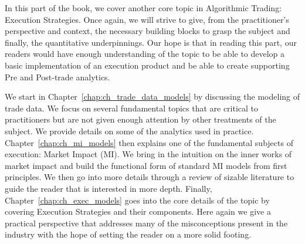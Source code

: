 
In this part of the book, we cover another core topic in Algorithmic Trading: Execution Strategies. Once again, we will strive to give, from the practitioner's perspective and context, the necessary building blocks to grasp the subject and finally, the quantitative underpinnings. Our hope is that in reading this part, our readers would have enough understanding of the topic to be able to develop a basic implementation of an execution product and be able to create supporting Pre and Post-trade analytics.


We start in Chapter~\ref{chap:ch_trade_data_models} by discussing the modeling of trade data. We focus on several fundamental topics that are critical to practitioners but are not given enough attention by other treatments of the subject. We provide details on some of the analytics used in practice. Chapter~\ref{chap:ch_mi_models} then explains one of the fundamental subjects of execution: Market Impact (MI). We bring in the intuition on the inner works of market impact and build the functional form of standard MI models from first principles. We then go into more details through a review of sizable literature to guide the reader that is interested in more depth. Finally, Chapter~\ref{chap:ch_exec_models} goes into the core details of the topic by covering Execution Strategies and their components. Here again we give a practical perspective that addresses many of the misconceptions present in the industry with the hope of setting the reader on a more solid footing.
